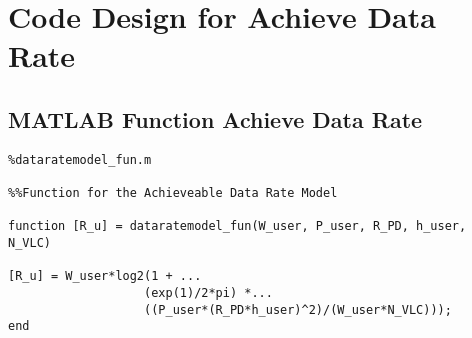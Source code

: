 \section{Code Design for Achieve Data Rate}
\begin{comment}
    Note that when the program was provided there existed error that had to be adjusted. These errors come from the name of the function where not the same as the function in the MATLAB code. I had to change them to ensure that it could call the correct code correctly. Second, the comments were helpful, but I needed to space out the code to ensure readbility.Once the errors were fixed I was able to run the program smoothly and investigate and attempt to understand the code.
\end{comment}




\subsection{MATLAB Function Achieve Data Rate}

\begin{lstlisting}
%dataratemodel_fun.m

%%Function for the Achieveable Data Rate Model

function [R_u] = dataratemodel_fun(W_user, P_user, R_PD, h_user, N_VLC)

[R_u] = W_user*log2(1 + ...
                   (exp(1)/2*pi) *...
                   ((P_user*(R_PD*h_user)^2)/(W_user*N_VLC)));
end
\end{lstlisting}

